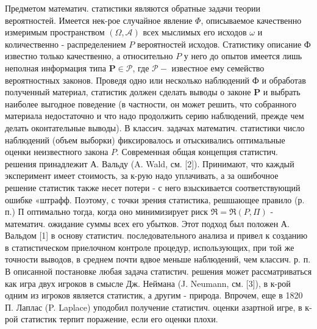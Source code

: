 \documentclass[10pt]{article}
\begin{document}
Предметом математич. статистики являются обратные задачи теории вероятностей. Имеется нек-рое случайное явление $\Phi$, описываемое качественно измеримым пространством $(\Omega, \mathcal{A})$ всех мыслимых его исходов $\omega$ и количественно - распределением $P$ вероятностей исходов. Статистику описание Ф известно только качественно, а относительно $P$ у него до опытов имеется лишь неполная информация типа $\boldsymbol{P} \in \mathscr{P}$, где $\mathscr{P}-$ известное ему семейство вероятностных законов. Проведя одно или несколько наблюдений $Ф$ и обработав полученный материал, статистик должен сделать выводы о законе $\boldsymbol{P}$ и выбрать наиболее выгодное поведение (в частности, он может решить, что собранного материала недостаточно и что надо продолжить серию наблюдений, прежде чем делать оконтательные выводы). В классич. задачах математич. статистики число наблюдений (объем выборки) фиксировалось и отыскивались оптимальные оценки неизвестного закона $P$. Современная общая концепция статистич. решения принадлежит А. Вальду (A. Wald, см. [2]). Принимают, что каждый эксперимент имеет стоимость, за к-рую надо уплачивать, а за ошибочное решение статистик также несет потери - с него взыскивается соответствующий ошибке «штрафф. Поэтому, с точки зрения статистика, решшающее правило (р. п.) П оптимально тогда, когда оно минимизирует риск $\mathfrak{R}=\mathfrak{\Re}(P, \Pi)$ - математич. ожидание суммы всех его убытков. Этот подход был положен А. Вальдом [1] в основу статистич. последовательного анализа и привел к созданию в статистическом приелочном контроле процедур, использующих, при той же точности выводов, в среднем почти вдвое меньше наблюдений, чем классич. р. п. В описанной постановке любая задача статистич. решения может рассматриваться как игра двух игроков в смысле Дж. Неймана (J. Neumann, см. [3]), в к-рой одним из игроков является статистик, а другим - природа. Впрочем, еще в 1820 П. Лаплас (P. Laplace) уподобил получение статистич. оценки азартной игре, в к-рой статистик терпит поражение, если его оценки плохи.
\end{document}
